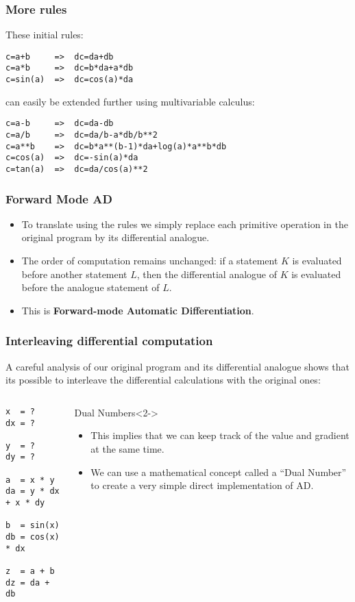 \documentclass[\beamerclass]{beamer}
\begin{document}
\begin{frame}[fragile]
\frametitle{More rules}

These initial rules:
\begin{lstlisting}
c=a+b     =>  dc=da+db
c=a*b     =>  dc=b*da+a*db
c=sin(a)  =>  dc=cos(a)*da
\end{lstlisting}
can easily be extended further using multivariable calculus:
\begin{lstlisting}
c=a-b     =>  dc=da-db
c=a/b     =>  dc=da/b-a*db/b**2
c=a**b    =>  dc=b*a**(b-1)*da+log(a)*a**b*db
c=cos(a)  =>  dc=-sin(a)*da
c=tan(a)  =>  dc=da/cos(a)**2
\end{lstlisting}
\end{frame}

\begin{frame}
\frametitle{Forward Mode AD}
\begin{itemize}
	\item<+-> To translate using the rules we simply replace each primitive operation in the original program by its differential analogue.
	\item<+-> The order of computation remains unchanged: if a statement $K$ is evaluated before another statement $L$, then the differential analogue of $K$ is evaluated before the analogue statement of $L$.
	\item<+-> This is \textbf{Forward-mode Automatic Differentiation}.
\end{itemize}
\end{frame}

\begin{frame}[fragile]
\frametitle{Interleaving differential computation}

A careful analysis of our original program and its differential analogue shows that its possible to interleave the differential calculations with the original ones:
\begin{columns}
\begin{lstlisting}
x  = ?
dx = ?

y  = ?
dy = ?

a  = x * y
da = y * dx + x * dy

b  = sin(x)
db = cos(x) * dx

z  = a + b
dz = da + db
\end{lstlisting}

\begin{block}{Dual Numbers}<2->
	\begin{itemize}
		\item<2-> This implies that we can keep track of the value and gradient at the same time.
		\item<3-> We can use a mathematical concept called a ``Dual Number'' to create a very simple direct implementation of AD.
	\end{itemize}
\end{block}

\end{columns}
\end{frame}
\end{document}
